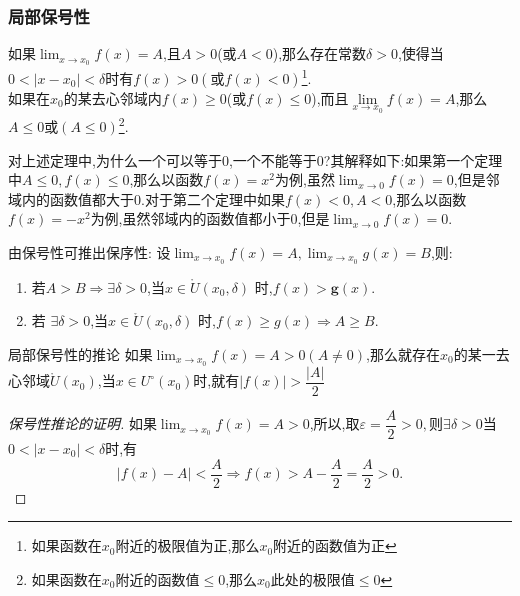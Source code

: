 \documentclass[8pt a4paper, oneside, UTF8]{ctexbook}
\begin{document}
\begin{sloppypar}
    \subsubsection{局部保号性}
    \begin{them}{}{}
        如果$\lim_{x\to x_0}f(x)=A$,且$A>0$(或$A<0$),那么存在常数$\delta>0$,使得当$0<|x-x_0|<\delta$时有$f(x)>0(或f(x)<0)$\footnote{如果函数在$x_0$附近的极限值为正,那么$x_0$附近的函数值为正}.
        \\
        如果在$x_0$的某去心邻域内$f(x)\geqslant 0$(或$f(x)\leqslant 0$),而且$\underset{x\to x_0}{\operatorname*{lim}}f(x)=A$,那么$A \leqslant 0$或$(A \leq 0)$\footnote{如果函数在$x_0$附近的函数值$\leq 0$,那么$x_0$此处的极限值$\le 0$}.
    \end{them}
    对上述定理中,为什么一个可以等于0,一个不能等于0?其解释如下:如果第一个定理中$A \leqslant 0,f(x)\leqslant 0$,那么以函数$f(x)={x^2}$为例,虽然$\lim_{x \to 0}f(x)=0 $,但是邻域内的函数值都大于0.对于第二个定理中如果$f(x) < 0,A< 0$,那么以函数$f(x)={-x^2}$为例,虽然邻域内的函数值都小于0,但是$\lim_{x \to 0}f(x)=0 $.
    \begin{criterion}{}{}
        由保号性可推出保序性:
        设$\lim_{x\to x_0}f(x)=A,\lim_{x\to x_{0}}g(x)=B$,则:
        \begin{enumerate}
            \item 若$A>B\Rightarrow\exists\delta>0$,当${x}\in\mathring{U}(x_0,\delta)$ 时,$f(x)>\mathbf{g}(x).$ 
            \item 若 $\exists\delta>0$,当$x\in\mathring{U}(x_0,\delta)$ 时,$f(x)\geqslant g(x)\Rightarrow A\geqslant B.$
        \end{enumerate}
    \end{criterion}
    \begin{corollary}{局部保号性的推论}{}
        如果$\lim_{x\to x_{0}}f(x)=A > 0(A \neq 0)$,那么就存在$x_0$的某一去心邻域$\mathring{U}\left(x_{0}\right)$,当$x\in U^{\circ}(x_{0})$时,就有$|f(x)|>\dfrac{|A|}{2}$
        \begin{proof}[保号性推论的证明]
            如果$\lim_{x\to x_{0}}f(x)=A > 0$,所以,取$\varepsilon=\dfrac{A}{2}>0,则\exists \delta >0 $当$0<|x-x_0|<\delta$时,有
            $$
                |f(x)-A|<\dfrac{A}{2}\Rightarrow f(x)>A-\dfrac{A}{2}=\dfrac{A}{2}>0.
            $$
        \end{proof}
    \end{corollary}

\end{sloppypar}
\end{document}
